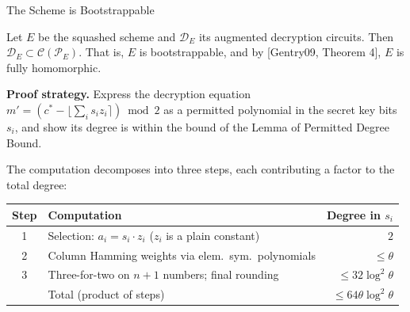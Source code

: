 \documentclass[10pt,handout]{beamer}
\begin{document}
\begin{frame}{The Scheme is Bootstrappable}
    \begin{theorem}
    Let $E$ be the squashed scheme and $\mathcal{D}_E$ its augmented
    decryption circuits. Then $\mathcal{D}_E \subset \mathcal{C}(\mathcal{P}_E)$.
    That is, $E$ is bootstrappable, and by [Gentry09, Theorem 4], $E$ is fully
    homomorphic.
    \end{theorem}
    \pause

    \vspace{0.3cm}
    \textbf{Proof strategy.}
    Express the decryption equation
    $m' = (c^* - \lfloor\sum_i s_i z_i\rceil) \bmod 2$
    as a permitted polynomial in the secret key bits $s_i$, and show its
    degree is within the bound of the Lemma of Permitted Degree Bound.

    \vspace{0.3cm}
    The computation decomposes into three steps, each contributing a factor
    to the total degree:

    \vspace{0.2cm}
    \begin{center}
    \renewcommand{\arraystretch}{1.3}
    \begin{tabular}{clr}
        \hline
        \textbf{Step} & \textbf{Computation} & \textbf{Degree in $s_i$} \\
        \hline
        1 & Selection:\; $a_i = s_i \cdot z_i$ \quad($z_i$ is a plain constant) & $2$ \\
        2 & Column Hamming weights via elem.\ sym.\ polynomials & $\leq\theta$ \\
        3 & Three-for-two on $n{+}1$ numbers; final rounding & $\leq 32\log^2\!\theta$ \\
        \hline
        & Total (product of steps) & $\leq 64\theta\log^2\!\theta$ \\
        \hline
    \end{tabular}
    \end{center}
\end{frame}



\end{document}
